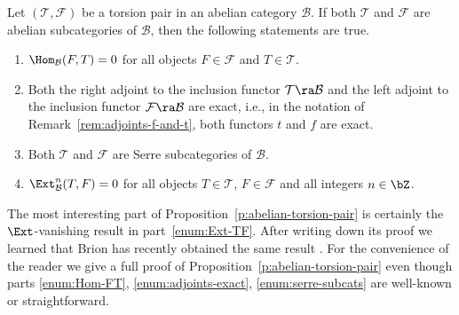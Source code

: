 \begin{proposition}
  \label{p:abelian-torsion-pair}
  Let $(\mathcal{T}, \mathcal{F})$
  be a torsion pair in an abelian category $\mathcal{B}$. If both
  $\mathcal{T}$ and $\mathcal{F}$ are abelian subcategories of
  $\mathcal{B}$, then the following statements are true.
  \begin{enumerate}
  \item 
    \label{enum:Hom-FT}
    $\Hom_\mathcal{B}(F, T)=0$ for all objects $F \in
    \mathcal{F}$ and $T \in 
    \mathcal{T}$.
  \item 
    \label{enum:adjoints-exact}
    Both the right adjoint to the inclusion functor
    $\mathcal{T} \ra \mathcal{B}$ and 
    the left adjoint to the inclusion functor
    $\mathcal{F} \ra \mathcal{B}$ are exact,
    i.e., in the notation of Remark~\ref{rem:adjoints-f-and-t},
    both functors $t$ and $f$ are exact.
  \item 
    \label{enum:serre-subcats}
    Both $\mathcal{T}$ and $\mathcal{F}$ are Serre
    subcategories of $\mathcal{B}$.
  \item 
    \label{enum:Ext-TF}
    $\Ext^n_\mathcal{B}(T,F)=0$ for all objects
    $T \in \mathcal{T}$, $F \in \mathcal{F}$ and all integers $n
    \in \bZ$. 
  \end{enumerate}
\end{proposition}

\begin{remark}
  The most interesting part of
  Proposition~\ref{p:abelian-torsion-pair} 
  is certainly the $\Ext$-vanishing result in
  part~\ref{enum:Ext-TF}.
  After writing down its proof we learned that Brion has recently
  obtained the same result \cite[Lemma 2.3]{brion2018}.  
  For the convenience of the reader we give a full proof of
  Proposition~\ref{p:abelian-torsion-pair} even though parts
  \ref{enum:Hom-FT}, \ref{enum:adjoints-exact},
  \ref{enum:serre-subcats} are well-known or straightforward.
\end{remark}

